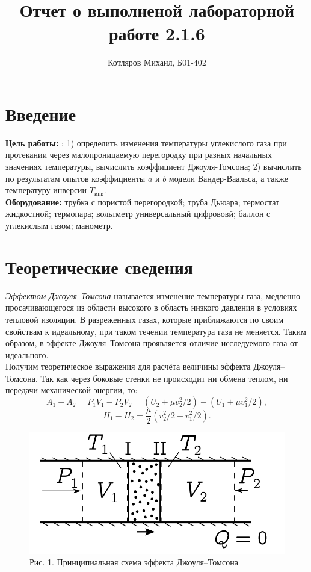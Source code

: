 \documentclass[a4paper]{article}
\title{\textbf{Отчет о выполненой лабораторной работе 2.1.6}}
\date{}
\author{Котляров Михаил, Б01-402}
\begin{document}
\maketitle
	
	\section{Введение}
	
	\textbf{Цель работы:} : 1) определить изменения температуры углекислого газа при протекании через малопроницаемую перегородку при разных начальных значениях температуры, вычислить коэффициент Джоуля-Томсона; 2) вычислить по результатам опытов коэффициенты $a$ и $b$ модели Вандер-Ваальса, а также температуру инверсии $T_{\text{инв}}$.\\

	\textbf{Оборудование:} трубка с пористой перегородкой; труба Дьюара; термостат
жидкостной; термопара; вольтметр универсальный цифрововй; баллон с углекислым газом; манометр.
	
	\section{Теоретические сведения}
\textit{Эффектом Джоуля–Томсона} называется изменение температуры газа, медленно
просачивающегося из области высокого в область низкого давления в условиях тепловой изоляции. В разреженных газах, которые приближаются по своим свойствам
к идеальному, при таком течении температура газа не меняется. Таким образом, в
эффекте Джоуля–Томсона проявляется отличие исследуемого газа от идеального.\\
Получим теоретическое выражения для расчёта величины эффекта Джоуля–Томсона.
Так как через боковые стенки не происходит ни обмена теплом, ни передачи механической энергии, то:
\begin{equation*}
	A_1-A_2 = P_1V_1-P_2V_2 = (U_2 + \mu v_2^2/2) - (U_1+\mu v_1^2/2),
\end{equation*}
\begin{equation*}
	H_1-H_2 = \frac{\mu}{2} (v_2^2/2 - v_1^2/2).
\end{equation*}
\begin{figure}[h!]
        \centering
        \includegraphics[scale=0.5]{Pictures/Scheme.png}
        \caption{
        Рис. 1. Принципиальная схема эффекта Джоуля–Томсона
        }
 \end{figure} 
\end{document}
